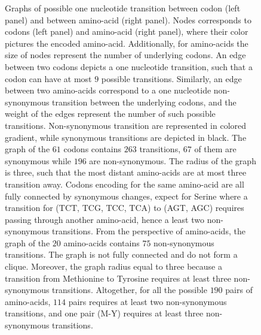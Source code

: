 \begin{figure}[htbp!]
	\caption[Graphs of {codon} and amino-acid transitions]{
		\label{fig:graph-codons-aa}
		Graphs of possible one nucleotide {transition} between \gls{codon} (left panel) and between amino-acid (right panel).
		Nodes corresponds to \glspl{codon} (left panel) and amino-acid (right panel), where their color pictures the encoded amino-acid.
		Additionally, for amino-acids the size of nodes represent the number of underlying \glspl{codon}.
		An edge between two \glspl{codon} depicts a one nucleotide {transition}, such that a \gls{codon} can have at most $9$ possible {transitions}.
		Similarly, an edge between two amino-acids correspond to a one nucleotide non-synonymous {transition} between the underlying \glspl{codon}, and the weight of the edges represent the number of such possible {transitions}.
		Non-synonymous {transition} are represented in colored gradient, while synonymous {transitions} are depicted in black.
		The graph of the $61$ \glspl{codon} contains $263$ {transitions}, $67$ of them are synonymous while $196$ are non-synonymous.
		The radius of the graph is three, such that the most distant amino-acids are at most three {transition} away.
		Codons encoding for the same amino-acid are all fully connected by synonymous changes, expect for Serine where a {transition} for (TCT, TCG, TCC,	TCA) to (AGT, AGC) requires passing through another amino-acid, hence a least two non-synonymous {transitions}.
		From the perspective of amino-acids, the graph of the $20$ amino-acids contains $75$ non-synonymous {transitions}.
		The graph is not fully connected and do not form a clique. Moreover, the graph radius equal to three because a {transition} from Methionine to Tyrosine requires at least three non-synonymous {transitions}.
		Altogether, for all the possible $190$ pairs of amino-acids, $114$ pairs requires at least two non-synonymous {transitions}, and one pair (M-Y) requires at least three non-synonymous {transitions}.
	}
\end{figure}

